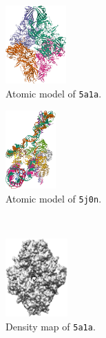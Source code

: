 
\begin{figure}[ht!]
    \centering
    \begin{minipage}[b]{0.45\linewidth}
        \centering
        \begin{subfigure}[b]{0.45\linewidth}
            \centering
            \includegraphics[height=3cm]{figures/5a1a_pdb.png}
            \caption{Atomic model of \texttt{5a1a}.}
        \end{subfigure}
        \hfill
        \begin{subfigure}[b]{0.45\linewidth}
            \centering
            \includegraphics[height=3cm]{figures/5j0n_pdb.png}
            \caption{Atomic model of \texttt{5j0n}.}
        \end{subfigure}
        \\ \vspace{0.5em}
        \begin{subfigure}[b]{0.45\linewidth}
            \centering
            \includegraphics[height=3cm]{figures/5a1a_5A_.png}
            \caption{Density map of \texttt{5a1a}.}
        \end{subfigure}
        \hfill
        \begin{subfigure}[b]{0.45\linewidth}

\end{subfigure}
\end{minipage}
\end{figure}
